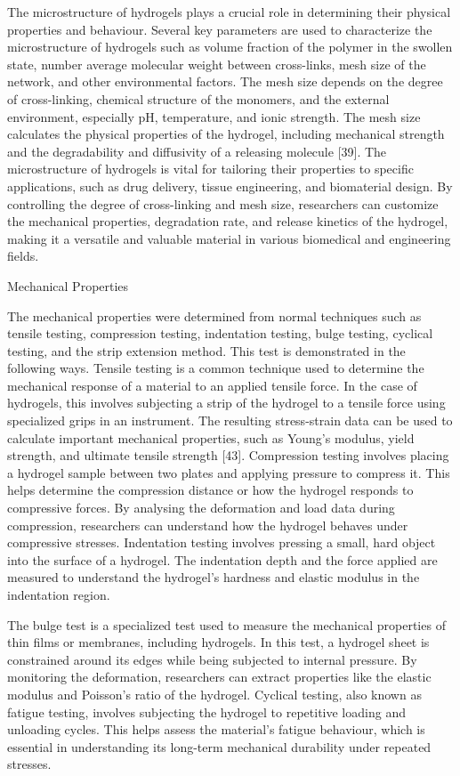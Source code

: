 \documentclass[../../main-notes.tex]{subfiles}
\begin{document}
The microstructure of hydrogels plays a crucial role in determining their physical properties and behaviour. 
Several key parameters are used to characterize the microstructure of hydrogels such as volume fraction of the polymer in the swollen state, number average molecular weight between cross-links, mesh size of the network, and other environmental factors. 
The mesh size depends on the degree of cross-linking, chemical structure of the monomers, and the external environment, especially pH, temperature, and ionic strength. 
The mesh size calculates the physical properties of the hydrogel, including mechanical strength and the degradability and diffusivity of a releasing molecule [39]. 
The microstructure of hydrogels is vital for tailoring their properties to specific applications, such as drug delivery, tissue engineering, and biomaterial design. 
By controlling the degree of cross-linking and mesh size, researchers can customize the mechanical properties, degradation rate, and release kinetics of the hydrogel, making it a versatile and valuable material in various biomedical and engineering fields. 




Mechanical Properties

The mechanical properties were determined from normal techniques such as tensile testing, compression testing, indentation testing, bulge testing, cyclical testing, and the strip extension method. 
This test is demonstrated in the following ways. 
Tensile testing is a common technique used to determine the mechanical response of a material to an applied tensile force. 
In the case of hydrogels, this involves subjecting a strip of the hydrogel to a tensile force using specialized grips in an instrument. 
The resulting stress-strain data can be used to calculate important mechanical properties, such as Young’s modulus, yield strength, and ultimate tensile strength [43]. 
Compression testing involves placing a hydrogel sample between two plates and applying pressure to compress it. 
This helps determine the compression distance or how the hydrogel responds to compressive forces. 
By analysing the deformation and load data during compression, researchers can understand how the hydrogel behaves under compressive stresses. 
Indentation testing involves pressing a small, hard object into the surface of a hydrogel. 
The indentation depth and the force applied are measured to understand the hydrogel’s hardness and elastic modulus in the indentation region. 

The bulge test is a specialized test used to measure the mechanical properties of thin films or membranes, including hydrogels. 
In this test, a hydrogel sheet is constrained around its edges while being subjected to internal pressure. 
By monitoring the deformation, researchers can extract properties like the elastic modulus and Poisson’s ratio of the hydrogel. 
Cyclical testing, also known as fatigue testing, involves subjecting the hydrogel to repetitive loading and unloading cycles. 
This helps assess the material’s fatigue behaviour, which is essential in understanding its long-term mechanical durability under repeated stresses.
\end{document}

